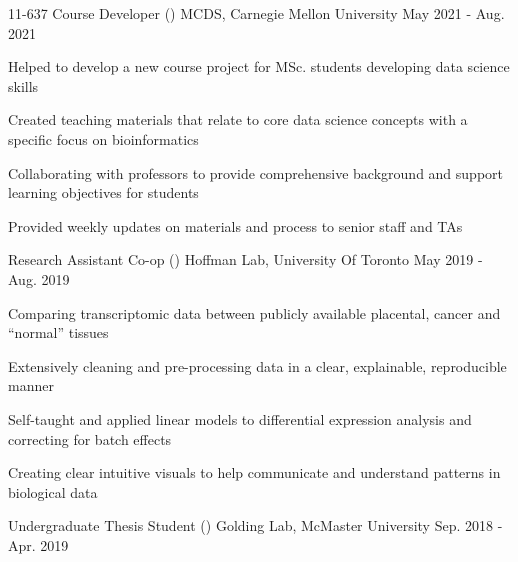 \begin{cventries}
    \cventry
    {11-637 Course Developer ()}
      {MCDS, Carnegie Mellon University}
      {May 2021 - Aug. 2021}
      {}%
      {
        \begin{cvitems}
        \item {Helped to develop a new course project for MSc. students developing data science skills}
        \item {Created teaching materials that relate to core data science concepts with a specific focus on bioinformatics}
        \item {Collaborating with professors to provide comprehensive background and support learning objectives for students}
        \item {Provided weekly updates on materials and process to senior staff and TAs}
        \end{cvitems}
      }
    \cventry
    {Research Assistant Co-op ()}
      {Hoffman Lab, University Of Toronto}
      {May 2019 - Aug. 2019}
      {}%
      {
        \begin{cvitems}
         \item {Comparing transcriptomic data between publicly available placental, cancer and ``normal'' tissues}
         \item {Extensively cleaning and pre-processing data in a clear, explainable, reproducible manner}
         \item {Self-taught and applied linear models to differential expression analysis and correcting for batch effects}
         \item {Creating clear intuitive visuals to help communicate and understand patterns in biological data}
        \end{cvitems}
      }
    \cventry
      {Undergraduate Thesis Student ()}
      {Golding Lab, McMaster University}
      {Sep. 2018 - Apr. 2019}
      {}%

\end{cventries}
